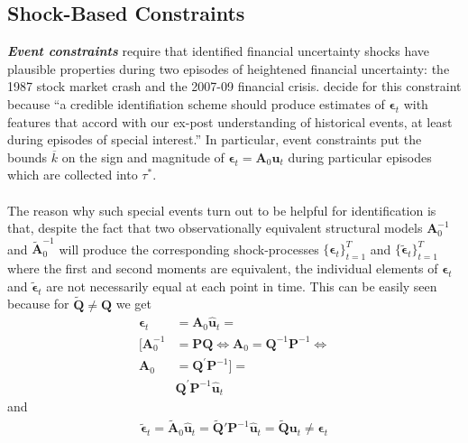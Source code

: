 \documentclass[a4paper,11pt,listof=nochaptergap,oneside,pointednumbers,bibtotoc,bigheadings,liststotoc]{scrbook}
\theoremstyle{mysatz}
\theoremstyle{mydefinition}
\theoremstyle{mybemerkung}
\let\oldhat\hat
\newcommand{\vect}[1]{\boldsymbol{\mathbf{#1}}}
\newcommand{\hatt}[1]{\oldhat{\boldsymbol{\mathbf{#1}}}}
\begin{document}
\subsection{Shock-Based Constraints}
\textbf{\textit{Event constraints}} require that identified financial uncertainty shocks have plausible properties during two episodes of heightened financial uncertainty: the 1987 stock market crash and the 2007-09 financial crisis. \citet{ludvigsonetal:18} decide for this constraint because ``a credible identifiation scheme should produce estimates of $\vect{\epsilon}_t$ with features that accord with our ex-post understanding of historical events, at least during episodes of special interest.'' \citep[p. 7]{ludvigsonetal:18}  In particular, event constraints put the bounds $\overline{k}$ on the sign and magnitude of $\vect{\epsilon}_t = \vect{A}_0\vect{u}_t$ during particular episodes which are collected into $\tau^*$. \\
\\
The reason why such special events turn out to be helpful for identification is that, despite the fact that two observationally equivalent structural models $\vect{A}_0^{-1}$ and $\widetilde{\vect{A}}_0^{-1}$ will produce the corresponding shock-processes $\big\{\vect{\epsilon}_t\big\}_{t=1}^T$ and $\big\{\widetilde{\vect{\epsilon}}_t\big\}_{t=1}^T$ where the first and second moments are equivalent, the individual elements of $\vect{\epsilon}_t$ and $\widetilde{\vect{\epsilon}}_t$ are not necessarily equal at each point in time. This can be easily seen because for $\widetilde{\vect{Q}} \neq \vect{Q}$ we get 
\begin{equation} \label{eq:svar_ludvi9}
\begin{split}
\vect{\epsilon}_t & = \vect{A}_0\hatt{\vect{u}}_t = \\
[\vect{A}_0^{-1} & = \vect{P}\vect{Q} \iff \vect{A}_0 = \vect{Q}^{-1}\vect{P}^{-1} \iff \\
\vect{A}_0 & = \vect{Q}^{'}\vect{P}^{-1}] = \\
	& \vect{Q}^'\vect{P}^{-1}\hatt{\vect{u}}_t 
\end{split}								
\end{equation}
and 
\begin{equation} \label{eq:svar_ludvi10}
\begin{split}
\widetilde{\vect{\epsilon}}_t = \widetilde{\vect{A}}_0\hatt{\vect{u}}_t = \widetilde{\vect{Q}}'\vect{P}^{-1}\hatt{\vect{u}}_t = \widetilde{\vect{Q}}\vect{u}_t \neq \vect{\epsilon}_t
\end{split}								
\end{equation}
\end{document}
